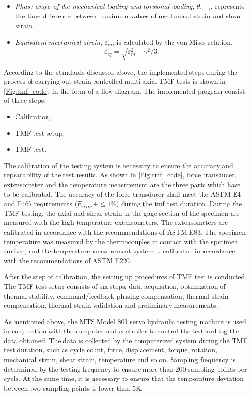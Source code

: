 \begin{itemize}
  \item {\em Phase angle of the mechanical loading and torsional loading}, $\theta_{\varepsilon-\gamma}$, represents the time difference between maximum values of mechanical strain and shear strain.
  \item {\em Equivalent mechanical strain}, $\varepsilon_{eq}$, is calculated by the von Mises relation\cite{Pol1991Cyclic},
  \begin{equation}
  \varepsilon_{eq}=\sqrt {\varepsilon _m^2 + {\gamma ^2}/3}.
  \end{equation}
\end{itemize}

According to the standards discussed above, the implemented steps during the process of carrying out strain-controlled multi-axial TMF tests is shown in \ref{Fig:tmf_code}, in the form of a flow diagram.
The implemented program consist of three steps:
\begin{itemize}
  \item Calibration,
  \item TMF test setup,
  \item TMF test.
\end{itemize}

The calibration of the testing system is necessary to ensure the accuracy and repeatability of the test results.
As shown in \ref{Fig:tmf_code}, force transducer, extensometer and the temperature measurement are the three parts which have to be calibrated.
The accuracy of the force transducer shall meet the ASTM E4 and E467 requirements ($F_{error}\pm \leq 1\%$) during the tmf test duration.
During the TMF testing, the axial and shear strain in the gage section of the specimen are measured with the high temperature extensometers.
The extensometers are calibrated in accordance with the recommendations of ASTM E83.
The specimen temperature was measured by the thermocouples in contact with the specimen surface, and the temperature measurement system is calibrated in accordance with the recommendations of ASTM E220.

After the step of calibration, the setting up procedures of TMF test is conducted.
The TMF test setup consists of six steps: data acquisition, optimization of thermal stability, command/feedback phasing compensation, thermal strain compensation, thermal strain validation and preliminary measurements.

As mentioned above, the MTS Model 809 servo hydraulic testing machine is used in conjunction with the computer and controller to control the test and log the data obtained.
The data is collected by the computerized system during the TMF test duration, such as cycle count, force, displacement, torque, rotation, mechanical strain, shear strain, temperature and so on. Sampling frequency is determined by the testing frequency to ensure more than 200 sampling points per cycle. At the same time, it is necessary to ensure that the temperature deviation between two sampling points is lower than 5K.

